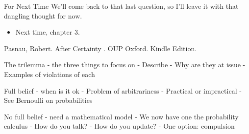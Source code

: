 \documentclass[
  17pt,
  letterpaper,
  ignorenonframetext,
  aspectratio=169,
  handout]{beamer}
\providecommand{\tightlist}{%
  \setlength{\itemsep}{0pt}\setlength{\parskip}{0pt}}\usepackage{longtable,booktabs,array}
\begin{document}
\begin{frame}{For Next Time}
\protect\hypertarget{for-next-time}{}
We'll come back to that last question, so I'll leave it with that
dangling thought for now.

\begin{itemize}[<+->]
\tightlist
\item
  Next time, chapter 3.
\end{itemize}

Pasnau, Robert. After Certainty . OUP Oxford. Kindle Edition.

The trilemma - the three things to focus on - Describe - Why are they at
issue - Examples of violations of each

Full belief - when is it ok - Problem of arbitrariness - Practical or
impractical - See Bernoulli on probabilities

No full belief - need a mathematical model - We now have one the
probability calculus - How do you talk? - How do you update? - One
option: compulsion
\end{frame}
\end{document}
